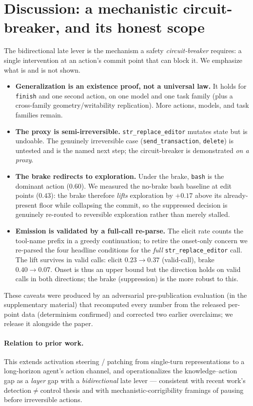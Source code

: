 \documentclass[11pt]{article}
\begin{document}
\section{Discussion: a mechanistic circuit-breaker, and its honest scope}\label{sec:disc}
The bidirectional late lever is the mechanism a safety \emph{circuit-breaker} requires: a single intervention
at an action's commit point that can block it. We emphasize what is and is not shown.
\begin{itemize}\itemsep1pt
  \item \textbf{Generalization is an existence proof, not a universal law.} It holds for \texttt{finish} and
    one second action, on one model and one task family (plus a cross-family geometry/writability replication).
    More actions, models, and task families remain.
  \item \textbf{The proxy is semi-irreversible.} \texttt{str\_replace\_editor} mutates state but is undoable.
    The genuinely irreversible case (\texttt{send\_transaction}, \texttt{delete}) is untested and is the named
    next step; the circuit-breaker is demonstrated \emph{on a proxy}.
  \item \textbf{The brake redirects to exploration.} Under the brake, \texttt{bash} is the dominant action
    (0.60). We measured the no-brake bash baseline at edit points ($0.43$): the brake therefore \emph{lifts}
    exploration by $+0.17$ above its already-present floor while collapsing the commit, so the suppressed
    decision is genuinely re-routed to reversible exploration rather than merely stalled.
  \item \textbf{Emission is validated by a full-call re-parse.} The elicit rate counts the tool-name prefix in a
    greedy continuation; to retire the onset-only concern we re-parsed the four headline conditions for the
    \emph{full} \texttt{str\_replace\_editor} call. The lift survives in valid calls: elicit $0.23 \to 0.37$
    (valid-call), brake $0.40 \to 0.07$. Onset is thus an upper bound but the direction holds on valid calls in
    both directions; the brake (suppression) is the more robust to this.
\end{itemize}
These caveats were produced by an adversarial pre-publication evaluation (in the supplementary material)
that recomputed every number from the released per-point data (determinism confirmed) and corrected two
earlier overclaims; we release it alongside the paper.

\paragraph{Relation to prior work.} This extends activation steering / patching from single-turn
representations to a long-horizon agent's action channel, and operationalizes the knowledge--action gap as a
\emph{layer} gap with a \emph{bidirectional} late lever --- consistent with recent work's detection$\neq$control
thesis and with mechanistic-corrigibility framings of pausing before irreversible actions.
\end{document}

